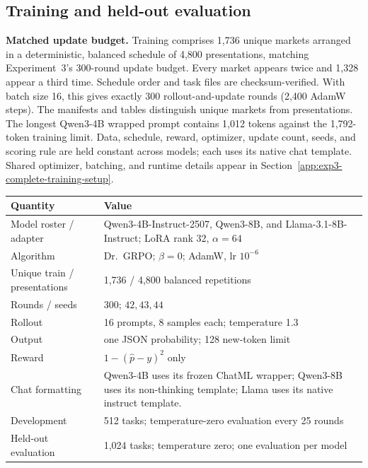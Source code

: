 \subsection{Training and held-out evaluation}

\noindent\textbf{Matched update budget.}
Training comprises 1,736 unique markets arranged in a deterministic, balanced
schedule of 4,800 presentations, matching Experiment~3's 300-round update budget.
Every market appears twice and 1,328 appear a third time. Schedule order and task
files are checksum-verified. With batch size 16, this gives exactly 300
rollout-and-update rounds (2,400 AdamW steps). The manifests and tables distinguish
unique markets from presentations. The longest Qwen3-4B wrapped prompt contains
1,012 tokens against the 1,792-token training limit. Data, schedule, reward,
optimizer, update count, seeds, and scoring rule are held constant across models;
each uses its native chat template.
Shared optimizer, batching, and runtime details appear in
Section~\ref{app:exp3-complete-training-setup}.

\begin{center}
\begin{minipage}{\linewidth}
\centering
{}
\label{tab:exp3b-hparams}
\scriptsize
\begin{tabular}{p{.34\linewidth}p{.59\linewidth}}
\toprule
\textbf{Quantity} & \textbf{Value} \\
\midrule
Model roster / adapter & Qwen3-4B-Instruct-2507, Qwen3-8B, and
Llama-3.1-8B-Instruct; LoRA rank 32, $\alpha=64$ \\
Algorithm & Dr.~GRPO; $\beta=0$; AdamW, lr $10^{-6}$ \\
Unique train / presentations & 1,736 / 4,800 balanced repetitions \\
Rounds / seeds & 300; $42,43,44$ \\
Rollout & 16 prompts, 8 samples each; temperature 1.3 \\
Output & one JSON probability; 128 new-token limit \\
Reward & $1-(\hat p-y)^2$ only \\
Chat formatting & Qwen3-4B uses its frozen ChatML wrapper; Qwen3-8B uses
its non-thinking template; Llama uses its native instruct template. \\
Development & 512 tasks; temperature-zero evaluation every 25 rounds \\
Held-out evaluation & 1,024 tasks; temperature zero; one evaluation per model \\
\bottomrule
\end{tabular}
\end{minipage}
\end{center}

